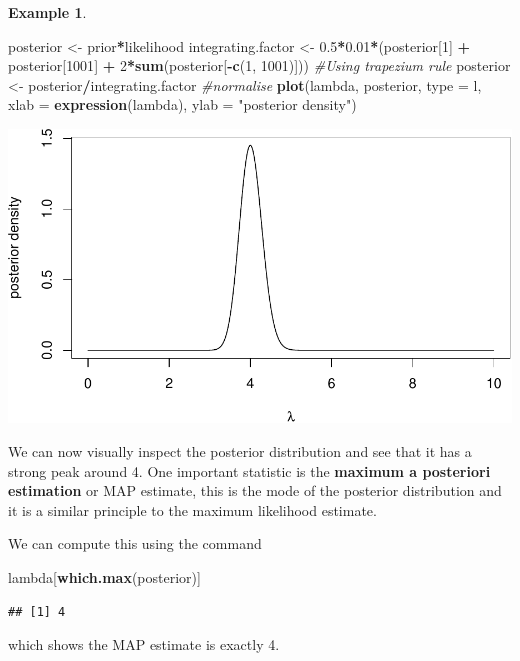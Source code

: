 \documentclass[
]{book}
\newenvironment{Shaded}{\begin{snugshade}}{\end{snugshade}}
\newcommand{\AttributeTok}[1]{\textcolor[rgb]{0.13,0.29,0.53}{#1}}
\newcommand{\CommentTok}[1]{\textcolor[rgb]{0.56,0.35,0.01}{\textit{#1}}}
\newcommand{\DecValTok}[1]{\textcolor[rgb]{0.00,0.00,0.81}{#1}}
\newcommand{\FloatTok}[1]{\textcolor[rgb]{0.00,0.00,0.81}{#1}}
\newcommand{\FunctionTok}[1]{\textcolor[rgb]{0.13,0.29,0.53}{\textbf{#1}}}
\newcommand{\NormalTok}[1]{#1}
\newcommand{\OtherTok}[1]{\textcolor[rgb]{0.56,0.35,0.01}{#1}}
\newcommand{\SpecialCharTok}[1]{\textcolor[rgb]{0.81,0.36,0.00}{\textbf{#1}}}
\newcommand{\StringTok}[1]{\textcolor[rgb]{0.31,0.60,0.02}{#1}}
\theoremstyle{definition}
\theoremstyle{definition}
\newtheorem{example}{Example}[chapter]
\theoremstyle{definition}
\theoremstyle{definition}
\theoremstyle{remark}
\begin{document}
\begin{example}
\begin{Shaded}
\begin{Highlighting}[]
\NormalTok{posterior }\OtherTok{\textless{}{-}}\NormalTok{ prior}\SpecialCharTok{*}\NormalTok{likelihood}
\NormalTok{integrating.factor }\OtherTok{\textless{}{-}} \FloatTok{0.5}\SpecialCharTok{*}\FloatTok{0.01}\SpecialCharTok{*}\NormalTok{(posterior[}\DecValTok{1}\NormalTok{] }\SpecialCharTok{+}\NormalTok{ posterior[}\DecValTok{1001}\NormalTok{] }\SpecialCharTok{+} \DecValTok{2}\SpecialCharTok{*}\FunctionTok{sum}\NormalTok{(posterior[}\SpecialCharTok{{-}}\FunctionTok{c}\NormalTok{(}\DecValTok{1}\NormalTok{, }\DecValTok{1001}\NormalTok{)])) }\CommentTok{\#Using trapezium rule}
\NormalTok{posterior }\OtherTok{\textless{}{-}}\NormalTok{ posterior}\SpecialCharTok{/}\NormalTok{integrating.factor }\CommentTok{\#normalise}
\FunctionTok{plot}\NormalTok{(lambda, posterior, }\AttributeTok{type =} \StringTok{\textquotesingle{}l\textquotesingle{}}\NormalTok{, }\AttributeTok{xlab =} \FunctionTok{expression}\NormalTok{(lambda), }
     \AttributeTok{ylab =} \StringTok{"posterior density"}\NormalTok{)}
\end{Highlighting}
\end{Shaded}

\includegraphics{_main_files/figure-latex/unnamed-chunk-19-1.pdf}

We can now visually inspect the posterior distribution and see that it has a strong peak around 4. One important statistic is the \textbf{maximum a posteriori estimation} or MAP estimate, this is the mode of the posterior distribution and it is a similar principle to the maximum likelihood estimate.

We can compute this using the command

\begin{Shaded}
\begin{Highlighting}[]
\NormalTok{lambda[}\FunctionTok{which.max}\NormalTok{(posterior)]}
\end{Highlighting}
\end{Shaded}

\begin{verbatim}
## [1] 4
\end{verbatim}

which shows the MAP estimate is exactly 4.
\end{example}
\end{document}
